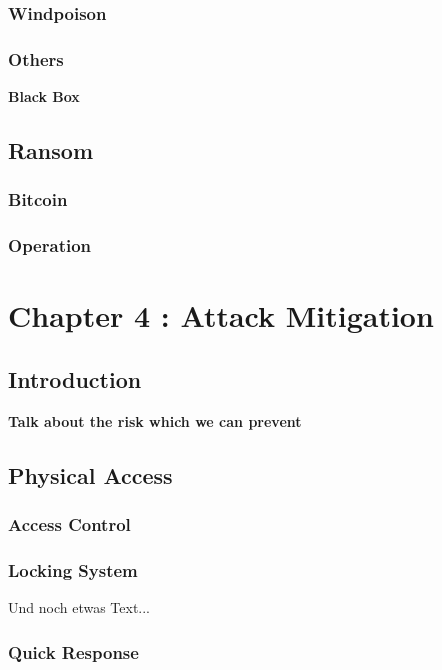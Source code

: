 \documentclass[twosided,a4,10pt]{article}
\begin{document}
\begin{multicols}{2}
 \subsubsection{Windpoison}
 \lipsum[1]
 \subsubsection{Others}
 \textbf{Black Box}
 \lipsum[1]
 
\subsection{Ransom}
 \subsubsection{Bitcoin}
 \lipsum[1]
 \subsubsection{Operation}
 \lipsum[1]



\section{Chapter 4 : Attack Mitigation }

\subsection{Introduction}
 \textbf{Talk about the risk which we can prevent}
 \lipsum[1]



\subsection{Physical Access}

 \subsubsection{Access Control}
 \lipsum[1]

 \subsubsection{Locking System}
 Und noch etwas Text... \cite{muster} \newline
 \lipsum[1]
 \subsubsection{Quick Response}
 \lipsum[1]


\end{multicols}
\end{document}
